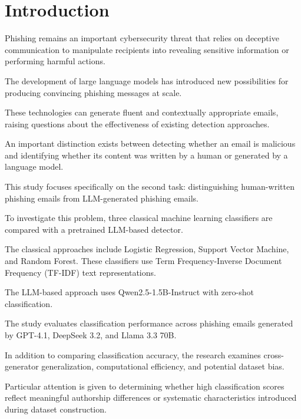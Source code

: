 \documentclass[sigconf,nonacm]{acmart}
\begin{document}

\maketitle

\section{Introduction}

Phishing remains an important cybersecurity threat
that relies on deceptive communication to manipulate
recipients into revealing sensitive information or
performing harmful actions.

The development of large language models has
introduced new possibilities for producing
convincing phishing messages at scale.

These technologies can generate fluent and
contextually appropriate emails, raising questions
about the effectiveness of existing detection
approaches.

An important distinction exists between detecting
whether an email is malicious and identifying
whether its content was written by a human or
generated by a language model.

This study focuses specifically on the second task:
distinguishing human-written phishing emails from
LLM-generated phishing emails.

To investigate this problem, three classical machine
learning classifiers are compared with a pretrained
LLM-based detector.

The classical approaches include Logistic Regression,
Support Vector Machine, and Random Forest.
These classifiers use Term Frequency-Inverse Document
Frequency (TF-IDF) text representations.

The LLM-based approach uses Qwen2.5-1.5B-Instruct
with zero-shot classification.

The study evaluates classification performance
across phishing emails generated by GPT-4.1,
DeepSeek 3.2, and Llama 3.3 70B.

In addition to comparing classification accuracy,
the research examines cross-generator generalization,
computational efficiency, and potential dataset bias.

Particular attention is given to determining whether
high classification scores reflect meaningful
authorship differences or systematic characteristics
introduced during dataset construction.
\end{document}
